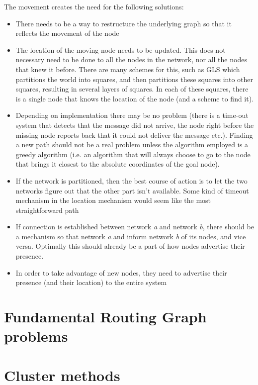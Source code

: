 \documentclass[letter, 12pt, english, draft]{article}
\begin{document}
The movement creates the need for the following solutions:
\begin{itemize}
\item There needs to be a way to restructure the underlying graph so that it reflects the movement of the node \cite{practical}
\item The location of the moving node needs to be updated. This does not necessary need to be done to all the nodes in the network, nor all the nodes that knew it before. There are many schemes for this, such as GLS \cite{scaleLocation} which partitions the world into squares, and then partitions these squares into other squares, resulting in several layers of squares. In each of these squares, there is a single node that knows the location of the node (and a scheme to find it).
\item Depending on implementation there may be no problem (there is a time-out system that detects that the message did not arrive, the node right before the missing node reports back that it could not deliver the message etc.). Finding a new path should not be a real problem unless the algorithm employed is a greedy algorithm (i.e. an algorithm that will always choose to go to the node that brings it closest to the absolute coordinates of the goal node).
\item If the network is partitioned, then the best course of action is to let the two networks figure out that the other part isn't available. Some kind of timeout mechanism in the location mechanism would seem like the most straightforward path
\item If connection is established between network \emph{a} and network \emph{b}, there should be a mechanism so that network \emph{a} and inform network \emph{b} of its nodes, and vice versa. Optimally this should already be a part of how nodes advertise their presence.
\item In order to take advantage of new nodes, they need to advertise their presence (and their location) to the entire system 
\end{itemize}

\section{Fundamental Routing Graph problems}



\section{Cluster methods}
\end{document}

